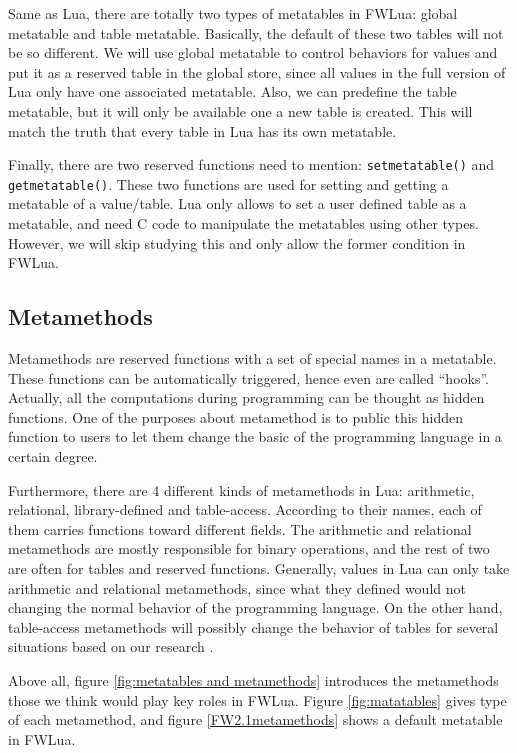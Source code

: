 Same as Lua, there are totally two types of metatables in FWLua: global metatable and table metatable. Basically, the default of these two tables will not be so different. We will use global metatable to control behaviors for values and put it as a reserved table in the global store, since all values in the full version of Lua only have one associated metatable. Also, we can predefine the table metatable, but it will only be available one a new table is created. This will match the truth that every table in Lua has its own metatable.

Finally, there are two reserved functions need to mention: {\tt setmetatable()} and {\tt getmetatable()}. These two functions are used for setting and getting a metatable of a value/table. %
Lua only allows to set a user defined table as a metatable, and need C code to manipulate the metatables using other types. However, we will skip studying this and only allow the former condition in FWLua.

\subsection{Metamethods}
Metamethods are reserved functions with a set of special names in a metatable. These functions can be automatically triggered, hence even are called ``hooks''. Actually, all the computations during programming can be thought as hidden functions. One of the purposes about metamethod is to public this hidden function to users to let them change the basic of the programming language in a certain degree.

Furthermore, there are 4 different kinds of metamethods in Lua: arithmetic, relational, library-defined and table-access. According to their names, each of them carries functions toward different fields. The arithmetic and relational metamethods are mostly responsible for binary operations, and the rest of two are often for tables and reserved functions. Generally, values in Lua can only take arithmetic and relational metamethods, since what they defined would not changing the normal behavior of the programming language. On the other hand, table-access metamethods will possibly change the behavior of tables for several situations based on our research \cite{PIL}.

Above all, figure \ref{fig:metatables and metamethods} introduces the metamethods those we think would play key roles in FWLua. Figure \ref{fig:matatables} gives type of each metamethod, and figure \ref{FW2.1metamethods} shows a default metatable in FWLua.

